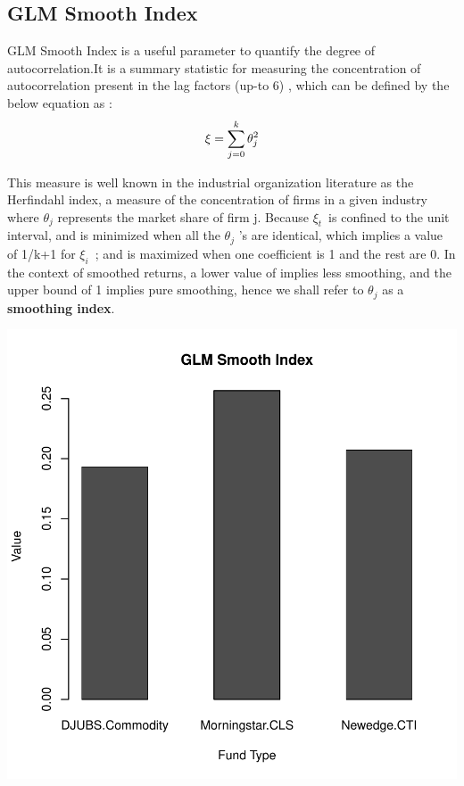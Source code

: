 \documentclass[12pt,letterpaper,english]{article}
\begin{document}
\subsection{GLM Smooth Index}
GLM Smooth Index is a useful parameter to quantify the degree of autocorrelation.It is a summary statistic for measuring the concentration of autocorrelation present in the lag factors (up-to 6) , which can be defined by the below equation as :
\begin{equation}
\xi =   \sum_{j=0}^{k} \theta _j^2 \\
\end{equation}

This measure is well known in the industrial organization literature as the Herfindahl index, a measure of the concentration of firms in a given industry where $\theta$\(_j\) represents the market share of firm j. Because $\xi_t$\ is confined to the unit interval, and is minimized when all the $\theta$\(_j\) 's are identical, which implies a value of 1/k+1 for $\xi_i$\ ; and is maximized when one coefficient is 1 and the rest are 0. In the context of smoothed returns, a lower value of implies less smoothing, and the upper bound of 1 implies pure smoothing, hence we shall refer to $\theta$\(_j\) as a \textbf{smoothing index}.

\includegraphics{Commodity-009}
\end{document}
